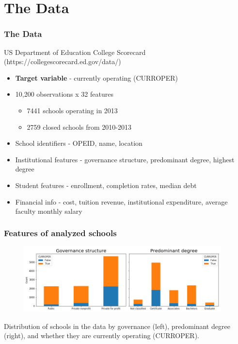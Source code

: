 \documentclass{beamer}
\begin{document}
\section{The Data} %

\begin{frame}
\frametitle{The Data}
US Department of Education College Scorecard \tiny{(https://collegescorecard.ed.gov/data/)}
\normalsize
\begin{itemize}
\item \textbf{Target variable} - currently operating (CURROPER)
\item 10,200 observations  x 32 features
\begin{itemize}
\item 7441 schools operating in 2013
\item 2759 closed schools from 2010-2013
\end{itemize}

\item School identifiers - OPEID, name, location
\item Institutional features - governance structure, predominant degree, highest degree 
\item Student features - enrollment, completion rates, median debt
\item Financial info - cost, tuition revenue, institutional expenditure, average faculty monthly salary
\end{itemize}

\end{frame}
\begin{frame} 
\frametitle{Features of analyzed schools}
\begin{center}
\begin{figure}
\includegraphics[width=4.25in]{currentGovDegStackBars.png}
\end{figure}
Distribution of schools in the data by governance (left), predominant degree (right), and whether they are currently operating (CURROPER).
\end{center}
\end{frame}
\end{document}
